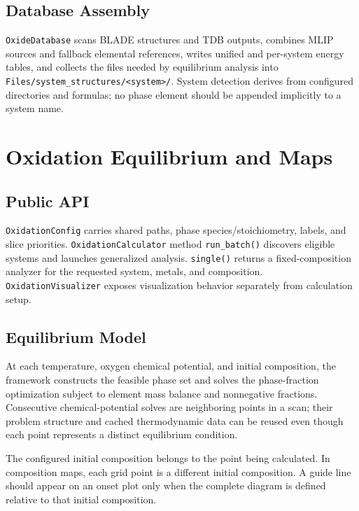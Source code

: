 \documentclass[11pt,letterpaper]{article}
\newcommand{\file}[1]{\nolinkurl{#1}}
\begin{document}
\subsection{Database Assembly}

\file{OxideDatabase} scans BLADE structures and TDB outputs, combines MLIP
sources and fallback elemental references, writes unified and per-system
energy tables, and collects the files needed by equilibrium analysis into
\file{Files/system_structures/<system>/}. System detection derives from
configured directories and formulas; no phase element should be appended
implicitly to a system name.

\section{Oxidation Equilibrium and Maps}

\subsection{Public API}

\file{OxidationConfig} carries shared paths, phase species/stoichiometry,
labels, and slice priorities. \file{OxidationCalculator} method
\file{run_batch()} discovers
eligible systems and launches generalized analysis. \file{single()} returns a
fixed-composition analyzer for the requested system, metals, and composition.
\file{OxidationVisualizer} exposes visualization behavior separately from
calculation setup.

\subsection{Equilibrium Model}

At each temperature, oxygen chemical potential, and initial composition, the
framework constructs the feasible phase set and solves the phase-fraction
optimization subject to element mass balance and nonnegative fractions.
Consecutive chemical-potential solves are neighboring points in a scan; their
problem structure and cached thermodynamic data can be reused even though each
point represents a distinct equilibrium condition.

The configured initial composition belongs to the point being calculated. In
composition maps, each grid point is a different initial composition. A guide
line should appear on an onset plot only when the complete diagram is defined
relative to that initial composition.
\end{document}
